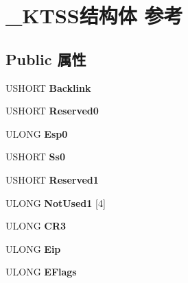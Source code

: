 \hypertarget{struct___k_t_s_s}{}\section{\+\_\+\+K\+T\+S\+S结构体 参考}
\label{struct___k_t_s_s}
\subsection*{Public 属性}
\begin{DoxyCompactItemize}
\item 
\mbox{\label{struct___k_t_s_s_a14cba40b36732d535c8f27adb67213df}} 
U\+S\+H\+O\+RT {\bfseries Backlink}
\item 
\mbox{\label{struct___k_t_s_s_a1efc250c51d328b8acbad487b543b9e3}} 
U\+S\+H\+O\+RT {\bfseries Reserved0}
\item 
\mbox{\label{struct___k_t_s_s_ab4b79ed4f856b845c643c815eef2156e}} 
U\+L\+O\+NG {\bfseries Esp0}
\item 
\mbox{\label{struct___k_t_s_s_ac3048e7a7915f1381d46b4f54e445237}} 
U\+S\+H\+O\+RT {\bfseries Ss0}
\item 
\mbox{\label{struct___k_t_s_s_ac845c5daa18d85d196547874db2ea208}} 
U\+S\+H\+O\+RT {\bfseries Reserved1}
\item 
\mbox{\label{struct___k_t_s_s_a2e2eb4fe1f3960735566a30791b1439b}} 
U\+L\+O\+NG {\bfseries Not\+Used1} \mbox{[}4\mbox{]}
\item 
\mbox{\label{struct___k_t_s_s_ac2cef2cad1fade2374493b14a6ca076e}} 
U\+L\+O\+NG {\bfseries C\+R3}
\item 
\mbox{\label{struct___k_t_s_s_a9b9e0964b24ab1d4ff8676f1f60c6123}} 
U\+L\+O\+NG {\bfseries Eip}
\item 
\mbox{\label{struct___k_t_s_s_ad5bf5931d04c99ac9f65b1d8a3c83426}} 
U\+L\+O\+NG {\bfseries E\+Flags}
\item 
\mbox{\label{struct___k_t_s_s_a24acd10f19cfd4167321918a86728b58}} 

\end{DoxyCompactItemize}
